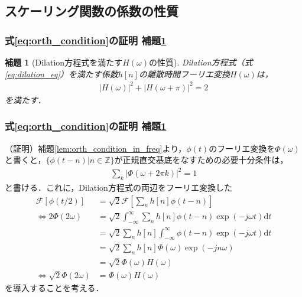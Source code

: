 \documentclass[dvipdfmx,graphicx,14pt]{beamer}
\newcommand{\ft}[1]{\mathcal{F}\left[ #1 \right]}
\newtheorem{mylemma}{補題}
\begin{document}
\subsection{スケーリング関数の係数の性質}

\begin{frame}[c]
    \frametitle{式\eqref{eq:orth_condition}の証明 補題\ref{lem:orth_condition_for_scaling_filter}}
    \begin{mylemma}[Dilation方程式を満たす$H(\omega)$の性質]
        Dilation方程式（式\eqref{eq:dilation_eq}）を満たす係数$h[n]$の離散時間フーリエ変換$H(\omega)$は，
        \begin{align}
            |H(\omega)|^{2} + |H(\omega+\pi)|^{2} = 2 \label{eq:scaling_orth_condition_in_freq}
        \end{align}
        を満たす．
        \label{lem:orth_condition_for_scaling_filter}
    \end{mylemma}
\end{frame}

\begin{frame}[c]
    \frametitle{式\eqref{eq:orth_condition}の証明 補題\ref{lem:orth_condition_for_scaling_filter}}
    \scriptsize
    （証明）補題\ref{lem:orth_condition_in_freq}より，$\phi(t)$のフーリエ変換を$\Phi(\omega)$と書くと，$\{ \phi(t - n) | n \in \mathbb{Z} \}$が正規直交基底をなすための必要十分条件は，
    \begin{align}
        \sum_{k} | \Phi(\omega + 2\pi k)|^{2} = 1 \label{eq:scale_orth_condition_in_freq}
    \end{align}
    と書ける．これに，Dilation方程式の両辺をフーリエ変換した
    \begin{align}
        \ft{\phi(t/2)} &= \sqrt{2}\ft{\sum_{n} h[n] \phi(t - n)} \nonumber \\
        \iff 2\Phi(2\omega) &= \sqrt{2} \int_{-\infty}^{\infty} \sum_{n} h[n] \phi(t - n) \exp(-j\omega t) \mathrm{d} t  \nonumber \\
        &= \sqrt{2} \sum_{n} h[n] \int_{-\infty}^{\infty} \phi(t - n) \exp(-j\omega t) \mathrm{d} t  \nonumber \\
        &= \sqrt{2} \sum_{n} h[n] \Phi(\omega) \exp(-jn\omega) \nonumber \\
        &= \sqrt{2} \Phi(\omega) H(\omega) \nonumber \\
        \iff \sqrt{2} \Phi(2\omega) &= \Phi(\omega) H(\omega) \label{eq:dilation_eq_in_freq}
    \end{align}
    を導入することを考える．
\end{frame}
\end{document}
